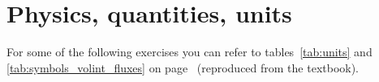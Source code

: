 \documentclass[a4paper,12pt,%
onecolumn,oneside,%
british%
]{memoir}
\newcommand{\addchap}[1]{\chapter*[#1]{#1}\addcontentsline{toc}{chapter}{#1}}
\renewcommand*{\|}[1][]{\nonscript\:#1\vert\nonscript\:\mathopen{}}
\begin{document}
\setlength{\epigraphwidth}{0.67\linewidth}
\epigraphfontsize{\footnotesize}
\setlength{\epigraphrule}{0pt}




\clearpage
{}
\tableofcontents*
\label{sec:toc}

\setcounter{chapter}{0}








\printpagenotes*
\clearpage
\chapter{Physics, quantities, units}
\label{cha:physics_quantities_units}
\setcounter{section}{-1}

For some of the following exercises you can refer to tables~\ref{tab:units} and \ref{tab:symbols_volint_fluxes} on page~\pageref{tab:units} (reproduced from the textbook).

\section{}
\end{document}
